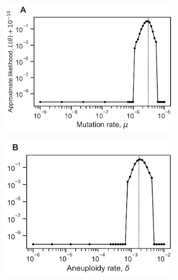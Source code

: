 \documentclass[12pt]{extarticle}
\begin{document}
\begin{figure}[p]
  \centering
  \begin{subfigure}{0.3\textwidth}
      \includegraphics[width=\textwidth]{../figures/sensitivity-A.pdf}      
      \label{fig:sensitivity-mutation}
  \end{subfigure}
  \begin{subfigure}{0.3\textwidth}
      \includegraphics[width=\textwidth]{../figures/sensitivity-B.pdf}      
      \label{fig:sensitivity-aneuploidy}
  \end{subfigure}
  \\
   \begin{subfigure}{0.3\textwidth}

\end{subfigure}
\end{figure}
\end{document}
